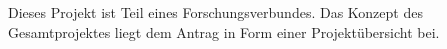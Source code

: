 \documentclass[11pt]{article}
\newcommand{\note}[1]{{\it \color{red} #1}}
\newcommand{\note}[1]{}
\begin{document}
Dieses Projekt ist Teil eines Forschungsverbundes. Das Konzept des Gesamtprojektes liegt dem Antrag in Form einer Projektübersicht bei.
% 


\end{document}
